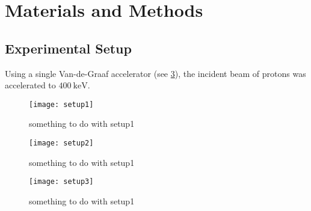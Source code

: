 \section{Materials and Methods}
\subsection{Experimental Setup}
Using a single Van-de-Graaf accelerator (see \cref{fig_setup3}), the incident
beam of protons was accelerated to $\SI{400}{\kilo\electronvolt}$.


\begin{figure}[h!]
    \centering
    \texttt{[image: setup1]}
    \caption{something to do with setup1}
    \label{fig_setup1}
\end{figure}

\begin{figure}[h!]
    \centering
    \texttt{[image: setup2]}
    \caption{something to do with setup1}
    \label{fig_setup2}
\end{figure}

\begin{figure}[h!]
    \centering
    \texttt{[image: setup3]}
    \caption{something to do with setup1}
    \label{fig_setup3}
\end{figure}


